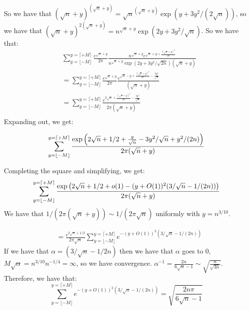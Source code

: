 \documentclass[]{article}
\begin{document}
So we have that $\left(\sqrt{n} + y\right)^{(\sqrt{n} + y)} = \sqrt{n}^{(\sqrt{n} + y)} \exp(y + 3y^2/(2 \sqrt{n}))$, so we have that $\left(\sqrt{n} + y\right)^{2(\sqrt{n} + y)} = n^{\sqrt{n} + y} \exp(2y + 3y^2/\sqrt{n})$. 
 So we have that:
\begin{align*}
	&\sum_{y = \lfloor -M \rfloor }^{y =  \lceil + M \rceil}
	\frac{e^{\sqrt{n} + y}}{2\pi}
	\frac{n^{\sqrt{n} + y} e^{\sqrt{n} + y + \frac{(\sqrt{n} + y)^2}{2n}}}
	{ n^{\sqrt{n} + y}\exp(2y + 3y^2/\sqrt{2n}) (\sqrt{n} + y) }\\
	&=
	\sum_{y = \lfloor -M \rfloor }^{y =  \lceil + M \rceil}
	\frac{e^{\sqrt{n} + y}}{2\pi}
	\frac{ e^{\sqrt{n} - y + \frac{(\sqrt{n} + y)^2}{2n} - \frac{3y^2}{\sqrt{n}}}}
	{(\sqrt{n} + y) }\\
	&=
	\sum_{y = \lfloor -M \rfloor }^{y =  \lceil + M \rceil}
	\frac{ e^{2\sqrt{n} + \frac{(\sqrt{n} + y)^2}{2n} - \frac{3y^2}{\sqrt{n}}}}
	{2 \pi(\sqrt{n} + y) }\\
\end{align*}
Expanding out, we get:

\begin{equation}
	\sum_{y = \lfloor -M \rfloor }^{y =  \lceil + M \rceil}
	\frac{\exp\left(2 \sqrt{n} + 1/2 + \frac{y}{\sqrt{n}} - 3y^2/\sqrt{n} + y^2/(2n)\right)}
	{2 \pi(\sqrt{n} + y) }\\
\end{equation}

Completing the square and simplifying, we get:
\begin{equation}
	\sum_{y = \lfloor -M \rfloor }^{y =  \lceil + M \rceil}
	\frac{\exp\left(
		2 \sqrt{n} + 1/2 + o(1) - (y + O(1))^2 (3/\sqrt{n} - 1/(2n))
		\right)}
	{2 \pi(\sqrt{n} + y) }\\
\end{equation}
We have that $1/(2 \pi (\sqrt{n} + y)) \sim 1/(2 \pi \sqrt{n})$ uniformly with $y = n^{3/10}$. 

\begin{align*}
	&=
	\frac{e^{2 \sqrt{n} + 1/2}}{2 \pi \sqrt{n}}
	\sum_{y = \lfloor -M \rfloor }^{y =  \lceil + M \rceil}
	e^{- (y + O(1))^2 (3/\sqrt{n} - 1/(2n))}
\end{align*}
If we have that $\alpha = (3/\sqrt{n} - 1/2n)$ then we have that $\alpha$ goes to 0, $M \sqrt{\alpha} = n^{3/10} n^{-1/4} = \infty$, so we have convergence. $\alpha^{-1} = \frac{2n}{6 \sqrt{n} - 1} \sim \sqrt{\frac{n}{\sqrt{3n}}}$.  Therefore, we have that:
\begin{equation}
	\sum_{y = \lfloor -M \rfloor }^{y =  \lceil + M \rceil}
	e^{-(y + O(1))^2 (3/\sqrt{n} - 1/(2n))}
	=
	\sqrt{\frac{2n \pi}{6 \sqrt{n} - 1}}
\end{equation}
\end{document}
